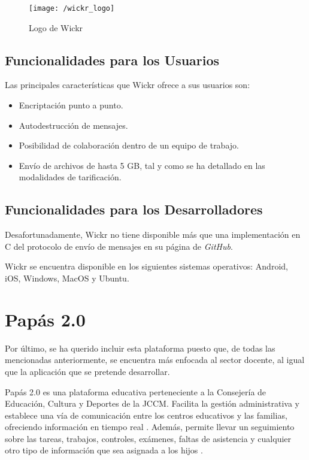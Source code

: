 \begin{figure}[!h]
	\begin{center}
		\texttt{[image: /wickr\_logo]}
		\caption{Logo de Wickr}
		\label{fig:wickr}
	\end{center}
\end{figure}

\subsection{Funcionalidades para los Usuarios}
Las principales características que Wickr ofrece a sus usuarios son:

\begin{itemize}
	\item Encriptación punto a punto.
	\item Autodestrucción de mensajes.
	\item Posibilidad de colaboración dentro de un equipo de trabajo.
	\item Envío de archivos de hasta 5 \acs{GB}, tal y como se ha detallado en las modalidades de tarificación.
\end{itemize}

\subsection{Funcionalidades para los Desarrolladores}
Desafortunadamente, Wickr no tiene disponible más que una implementación en C del protocolo de envío de mensajes en su página de \textit{GitHub}.

Wickr se encuentra disponible en los siguientes sistemas operativos: Android, iOS, Windows, MacOS y Ubuntu.

\section{Papás 2.0}

Por último, se ha querido incluir esta plataforma puesto que, de todas las mencionadas anteriormente, se encuentra más enfocada al sector docente, al igual que la aplicación que se pretende desarrollar.

Papás 2.0 es una plataforma educativa perteneciente a la Consejería de Educación, Cultura y Deportes de la \acf{JCCM}. Facilita la gestión administrativa y establece una vía de comunicación entre los centros educativos y las familias, ofreciendo información en tiempo real \cite{JCCM2017}. Además, permite llevar un seguimiento sobre las tareas, trabajos, controles, exámenes, faltas de asistencia y cualquier otro tipo de información que sea asignada a los hijos \cite{JCCM2010}.

